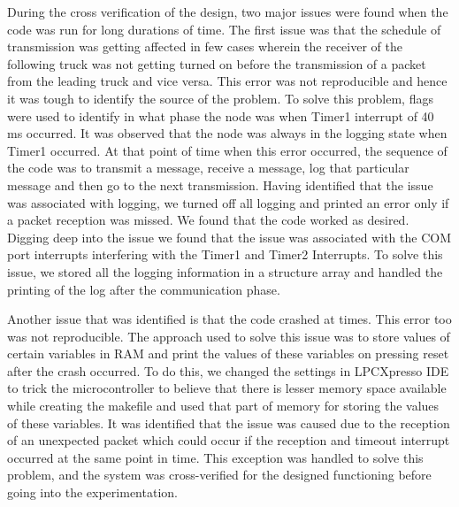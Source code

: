 During the cross verification of the design, two major issues were found when the code was run for long durations of time. The first issue was that the schedule of transmission was getting affected in few cases wherein the receiver of the following truck was not getting turned on before the transmission of a packet from the leading truck and vice versa. This error was not reproducible and hence it was tough to identify the source of the problem. To solve this problem, flags were used to identify in what phase the node was when Timer1 interrupt of 40 ms occurred. It was observed that the node was always in the logging state when Timer1 occurred. At that point of time when this error occurred, the sequence of the code was to transmit a message, receive a message, log that particular message and then go to the next transmission. Having identified that the issue was associated with logging, we turned off all logging and printed an error only if a packet reception was missed. We found that the code worked as desired. Digging deep into the issue we found that the issue was associated with the COM port interrupts interfering with the Timer1 and Timer2 Interrupts. To solve this issue, we stored all the logging information in a structure array and handled the printing of the log after the communication phase.

Another issue that was identified is that the code crashed at times. This error too was not reproducible. The approach used to solve this issue was to store values of certain variables in RAM and print the values of these variables on pressing reset after the crash occurred. To do this, we changed the settings in LPCXpresso IDE to trick the microcontroller to believe that there is lesser memory space available while creating the makefile and used that part of memory for storing the values of these variables. It was identified that the issue was caused due to the reception of an unexpected packet which could occur if the reception and timeout interrupt occurred at the same point in time. This exception was handled to solve this problem, and the system was cross-verified for the designed functioning before going into the experimentation.

